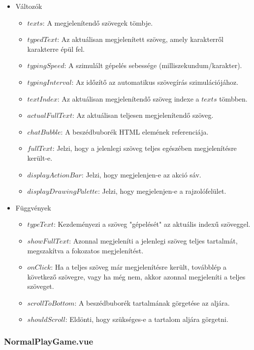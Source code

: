 \begin{itemize}
    \item Változók
    \begin{itemize}
        \item $texts$: A megjelenítendő szövegek tömbje.
        \item $typedText$: Az aktuálisan megjelenített szöveg, amely karakterről karakterre épül fel.
        \item $typingSpeed$: A szimulált gépelés sebessége (milliszekundum/karakter).
        \item $typingInterval$: Az időzítő az automatikus szövegírás szimulációjához.
        \item $textIndex$: Az aktuálisan megjelenítendő szöveg indexe a $texts$ tömbben.
        \item $actualFullText$: Az aktuálisan teljesen megjelenítendő szöveg.
        \item $chatBubble$: A beszédbuborék HTML elemének referenciája.
        \item $fullText$: Jelzi, hogy a jelenlegi szöveg teljes egészében megjelenítésre került-e.
        \item $displayActionBar$: Jelzi, hogy megjelenjen-e az akció sáv.
        \item $displayDrawingPalette$: Jelzi, hogy megjelenjen-e a rajzolófelület.
    \end{itemize}
    \item Függvények
    \begin{itemize}
        \item $typeText$: Kezdeményezi a szöveg "gépelését" az aktuális indexű szöveggel.
        \item $showFullText$: Azonnal megjeleníti a jelenlegi szöveg teljes tartalmát, megszakítva a fokozatos megjelenítést.
        \item $onClick$: Ha a teljes szöveg már megjelenítésre került, továbblép a következő szövegre, vagy ha még nem, akkor azonnal megjeleníti a teljes szöveget.
        \item $scrollToBottom$: A beszédbuborék tartalmának görgetése az aljára.
        \item $shouldScroll$: Eldönti, hogy szükséges-e a tartalom aljára görgetni.
    \end{itemize}
\end{itemize}

\subsubsection{NormalPlayGame.vue}
